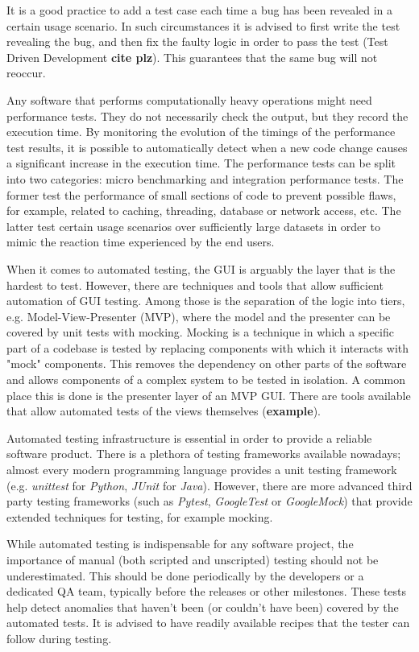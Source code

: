 \documentclass[jnr]{iosart2x}
\newcommand{\todo}[1]{\textbf{#1}}
\begin{document}
It is a good practice to add a test case each time a bug has been revealed in a certain usage scenario.
In such circumstances it is advised to first write the test revealing the bug, and then fix the faulty logic in order to pass the test (Test Driven Development \todo{cite plz}).
This guarantees that the same bug will not reoccur.

Any software that performs computationally heavy operations might need performance tests.
They do not necessarily check the output, but they record the execution time.
By monitoring the evolution of the timings of the performance test results, it is possible to automatically detect when a new code change causes a significant increase in the execution time.
The performance tests can be split into two categories: micro benchmarking and integration performance tests.
The former test the performance of small sections of code to prevent possible flaws, for example, related to caching, threading, database or network access, etc.
The latter test certain usage scenarios over sufficiently large datasets in order to mimic the reaction time  experienced by the end users.

When it comes to automated testing, the GUI is arguably the layer that is the hardest to test.
However, there are techniques and tools that allow sufficient automation of GUI testing.
Among those is the separation of the logic into tiers, e.g. Model-View-Presenter (MVP), where the model and the presenter can be covered by unit tests with mocking.
Mocking is a technique in which a specific part of a codebase is tested by replacing components with which it interacts with "mock" components.
This removes the dependency on other parts of the software and allows components of a complex system to be tested in isolation.
A common place this is done is the presenter layer of an MVP GUI.
There are tools available that allow automated tests of the views themselves (\todo{example}).

Automated testing infrastructure is essential in order to provide a reliable software product.
There is a plethora of testing frameworks available nowadays; almost every modern programming language provides a unit testing framework (e.g. {\it unittest} for {\it Python}, {\it JUnit} for {\it Java}).
However, there are more advanced third party testing frameworks (such as {\it Pytest}, {\it GoogleTest} or {\it GoogleMock}) that provide extended techniques for testing, for example mocking.

While automated testing is indispensable for any software project, the importance of manual (both scripted and unscripted) testing should not be underestimated.
This should be done periodically by the developers or a dedicated QA team, typically before the releases or other milestones.
These tests help detect anomalies that haven't been (or couldn't have been) covered by the automated tests.
It is advised to have readily available recipes that the tester can follow during testing.
\end{document}
